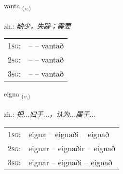 \documentclass[frontgrid, backgrid]{flacards}\usepackage[]{graphicx}\usepackage[]{xcolor}
\begin{document}
\renewcommand{\flhead}{\vskip5pt \fboxsep=0pt {\small\bfseries\footnotesize Sagnorð | 动词}}
\renewcommand{\fcfoot}{\vskip5pt \fboxsep=0pt \hspace{2pt}{\small\bfseries\footnotesize 1K}}

\renewcommand{\blhead}{\vskip5pt {\small\bfseries\footnotesize Sagnorð | 动词 }}
\renewcommand{\bcfoot}{\vskip5pt \hspace{2pt}{\small\bfseries\footnotesize 1K}}


{vanta \small{\textsubscript{(\textit{v.})}} \\[1ex] %
\textphonetic{[van̥ta]} \\
zh.: \emph{缺少，失踪；需要} \\  [2ex]
\renewcommand*{\arraystretch}{0.8}
\begin{tabular}{p{1cm}l}
\textsc{1sg}: &  --  -- vantað \\ 
\textsc{2sg}: &  --  -- vantað \\ 
\textsc{3sg}: &  --  -- vantað \\ 
\end{tabular}
}

\renewcommand{\flhead}{\vskip5pt \fboxsep=0pt {\small\bfseries\footnotesize Sagnorð | 动词}}
\renewcommand{\fcfoot}{\vskip5pt \fboxsep=0pt \hspace{2pt}{\small\bfseries\footnotesize 1K}}

\renewcommand{\blhead}{\vskip5pt {\small\bfseries\footnotesize Sagnorð | 动词 }}
\renewcommand{\bcfoot}{\vskip5pt \hspace{2pt}{\small\bfseries\footnotesize 1K}}


{eigna \small{\textsubscript{(\textit{v.})}} \\[1ex] %
\textphonetic{[eikna]} \\
zh.: \emph{把...归于...，认为...属于...} \\  [2ex]
\renewcommand*{\arraystretch}{0.8}
\begin{tabular}{p{1cm}l}
\textsc{1sg}: & eigna -- eignaði -- eignað \\ 
\textsc{2sg}: & eignar -- eignaðir -- eignað \\ 
\textsc{3sg}: & eignar -- eignaði -- eignað \\ 
\end{tabular}
}
\end{document}
